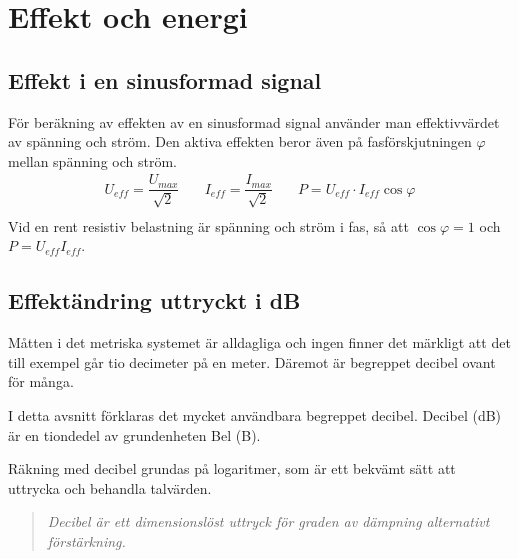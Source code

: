 
\section{Effekt och energi}
\label{effect och energi}

\subsection{Effekt i en sinusformad signal}

För beräkning av effekten av en sinusformad signal använder man effektivvärdet
av spänning och ström.
Den aktiva effekten beror även på fasförskjutningen \(\varphi\) mellan spänning
och ström.
\[\begin{array}{ccc}
    U_{\textit{eff}} = \dfrac{U_{max}}{\sqrt{2}} &
    \quad I_{\textit{eff}} = \dfrac{I_{max}}{\sqrt{2}} &
    \quad P = U_{\textit{eff}} \cdot I_{\textit{eff}} \cos\varphi \\
    \end{array}\]
Vid en rent resistiv belastning är spänning och ström i fas, så att
\(\cos\varphi = 1\) och \(P = U_{\textit{eff}} I_{\textit{eff}}\).


\subsection{Effektändring uttryckt i dB}
\label{decibel}
\label{effekt_db}

Måtten i det metriska systemet är alldagliga och ingen finner det märkligt att
det till exempel går tio decimeter på en meter.
Däremot är begreppet decibel ovant för många.

I detta avsnitt förklaras det mycket användbara begreppet decibel.
Decibel (dB) är en tiondedel av grundenheten Bel (B).

Räkning med decibel grundas på logaritmer, som är ett bekvämt sätt att uttrycka
och behandla talvärden.

\begin{quote}\emph{
Decibel är ett dimensionslöst uttryck för graden av dämpning alternativt
förstärkning.
}\end{quote}

